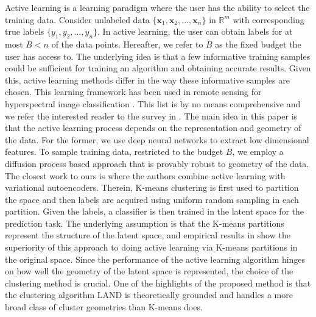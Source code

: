 \documentclass{article}
\def\x{{\mathbf x}}
\def\x{{\mathbf x}}
\begin{document}
Active learning is a learning paradigm where the user has the ability to select the training data\cite{cohn1995active,mackay1992information}.  Consider unlabeled data $\{\x_1,\x_2,...,\x_n\}$ in $\mathbb{R}^{m}$ with corresponding true labels $\{y_1,y_2,...,y_n\}$. In active learning, the user can obtain labels for at most $B<n$ of the data points. Hereafter, we refer to $B$ as the fixed budget the user has access to. The underlying idea is that a few informative training samples could be sufficient for training an algorithm and obtaining accurate results. Given this, active learning methods differ in the way these informative samples are chosen. This learning framework has been used in remote sensing for hyperspectral image classification \cite{liu2016active,wang2017novel,murphy2018iterative,tuia2009active}.  This list is by no means comprehensive and we refer the interested reader to the survey in \cite{tuia2011survey}. 
The main idea in this paper is that the active learning process depends on the representation and geometry of the data. For the former, we use deep neural networks to extract low
dimensional features. To sample training data, restricted to the budget $B$, we employ a diffusion process based approach that is provably robust to geometry of the data. 
 The closest work to ours is  \cite{pourkamali2019effectiveness} where the authors combine active learning with variational autoencoders. Therein, K-means clustering is first used to partition the space and then labels are acquired using uniform random sampling in each partition. Given the labels, a classifier is then trained in the latent space for the prediction task. The underlying assumption is that the K-means partitions represent the structure of the latent space, and empirical results in \cite{pourkamali2019effectiveness} show the superiority of this approach to doing active learning via K-means partitions in the original space. Since the performance of the active learning algorithm hinges on how well the geometry of the latent space is represented, the choice of the clustering method is crucial. One of the highlights of the proposed method is that the clustering algorithm LAND is theoretically grounded and handles a more broad class of cluster geometries than K-means does.
\end{document}
